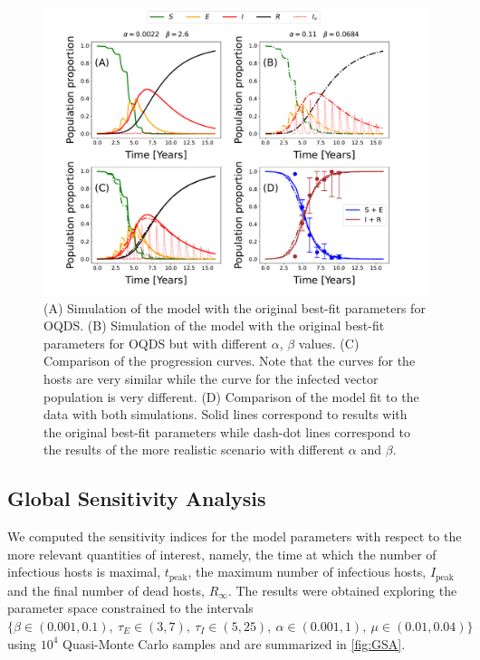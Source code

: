 \begin{figure}[H]
    \centering

    \includegraphics[width=\textwidth]{Figures/OQDS_different_vector_curves_same_host_curve.pdf}
    \caption[Comparison of the model fit to the data for OQDS with different
        transmission rates]{(A) Simulation of the model with the original
        best-fit
        parameters for OQDS. (B) Simulation of the model with the original
        best-fit
        parameters for OQDS but with different $\alpha$, $\beta$ values. (C)
        Comparison
        of the progression curves. Note that the curves for the hosts are very
        similar
        while the curve for the infected vector population is very different.
        (D)
        Comparison of the model fit to the data with both simulations. Solid
        lines
        correspond to results with the original best-fit parameters while
        dash-dot
        lines correspond to the results of the more realistic scenario with
        different
        $\alpha$ and $\beta$.}
    \label{fig:best_fit_model_OQDS}
\end{figure}

\subsection{Global Sensitivity Analysis}

We computed the sensitivity indices for the model parameters with respect
to the more relevant quantities of interest, namely, the time at which the
number of infectious hosts is maximal, $t_{\textrm{peak}}$, the maximum number
of infectious hosts, $I_{\textrm{peak}}$ and the final number of dead hosts,
$R_\infty$. The results were obtained exploring the parameter space constrained
to the intervals $\{\beta\in(0.001, 0.1), \ \tau_E\in(3,7), \ \tau_I\in(5,25),
    \ \alpha\in(0.001, 1), \ \mu\in(0.01, 0.04)\}$ using $10^4$ Quasi-Monte
Carlo
samples and are summarized in \cref{fig:GSA}.

